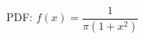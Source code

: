 \documentclass[preview]{standalone}
\begin{document}
PDF: $f(x) = \dfrac{1}{\pi\left(1 + x^2\right)}$\\
\end{document}
